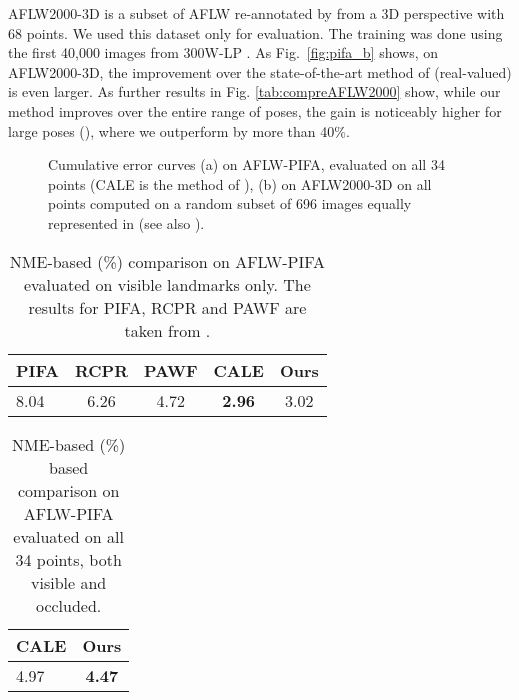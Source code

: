 \documentclass[10pt,journal,compsoc]{IEEEtran}
\begin{document}
AFLW2000-3D is a subset of AFLW re-annotated by \cite{zhu2016face} from a 3D perspective with 68 points. We used this dataset only for evaluation. The training was done using the first 40,000 images from 300W-LP \cite{zhu2016face}. As Fig.~\ref{fig:pifa_b} shows, on AFLW2000-3D, the improvement over the  state-of-the-art method of \cite{zhu2016face} (real-valued) is even larger. As further results in Fig. \ref{tab:compreAFLW2000} show, while our method improves over the entire range of poses, the gain is noticeably higher for large poses (), where we outperform \cite{zhu2016face} by more than 40\%.

\begin{figure}[!htb]
    \hfill
    \hfill
    \caption{Cumulative error curves (a) on AFLW-PIFA, evaluated on all 34 points (CALE is the method of \cite{bulat2016convolutional}), (b) on AFLW2000-3D on all points computed on a random subset of 696 images equally represented in  (see also \cite{zhu2016face}).}
    \label{fig:pifa}
\end{figure}

\begin{table}[!htbp]
    \renewcommand{\arraystretch}{1.3}
    \caption{NME-based (\%) comparison on AFLW-PIFA evaluated on visible landmarks only. The results for PIFA, RCPR and PAWF are taken from \cite{jourabloo2016large}.}
    \label{tab:pifaall}
    \centering
    \begin{tabular}{|l|c|c|c|c|}
        \hline
        PIFA \cite{jourabloo2015pose} & RCPR \cite{burgos2013robust} & PAWF \cite{jourabloo2016large} & CALE \cite{bulat2016convolutional} & Ours \\
        \hline\hline
        8.04                          & 6.26                         & 4.72                           & \textbf{2.96}                      & 3.02 \\
        \hline
    \end{tabular} \label{tab:pifa1}
\end{table}

\begin{table}[!htbp]
    \renewcommand{\arraystretch}{1.3}
    \caption{NME-based (\%) based comparison on AFLW-PIFA evaluated on all 34 points, both visible and occluded. }
    \label{tab:pifa}
    \centering
    \begin{tabular}{|l|c|}
        \hline
        CALE \cite{bulat2016convolutional} & Ours          \\
        \hline\hline
        4.97                               & \textbf{4.47} \\
        \hline
    \end{tabular} \label{tab:pifa2}
\end{table}
\end{document}
